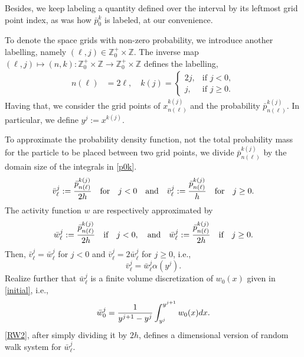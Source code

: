 \documentclass[11pt]{amsart}
\begin{document}
Besides, we keep labeling a quantity defined over the interval by its leftmost grid point index, as was how $\bar{p}^k_0$ is labeled, at our convenience.


To denote the space grids with non-zero probability, we introduce another labelling, namely $(\ell,j)\in \mathbb{Z}_0^+ \times \mathbb{Z}$. The inverse map $(\ell,j)\mapsto (n,k): \mathbb{Z}_0^+ \times \mathbb{Z} \rightarrow \mathbb{Z}_0^+ \times \mathbb{Z}$ defines the labelling,
\begin{align*}
 n(\ell) &= 2\ell, \quad 
 k(j)  =\left\{\begin{array}{lr}
        2j, & \text{if } j<0,\\
        j, & \text{if }  j\ge0.
        \end{array}\right.
\end{align*}
Having that, we consider the grid points of $x^{k(j)}_{n(\ell)}$ and the probability $\bar{p}_{n(\ell)}^{k(j)}$. In particular, we define $y^j:=x^{k(j)}$.

To approximate the probability density function, not the total probability mass for the particle to be placed between two grid points, we divide $\bar{p}_{n(\ell)}^{k(j)}$ by the domain size of the integrals in \eqref{p0k}. 
\begin{equation}\label{vj}
\bar{v}^{j}_\ell:={\bar{p}_{n(\ell)}^{k(j)} \over2h}\quad\text{for}\quad
j<0\quad\text{and}
\quad \bar{v}^{j}_\ell:={\bar{p}_{n(\ell)}^{k(j)}\over h}\quad\text{for}\quad j\ge0.
\end{equation}
The activity function $w$ are respectively approximated by
\begin{equation}\label{pandw}
\bar{w}^{j}_\ell:={\bar{p}_{n(\ell)}^{k(j)}\over2h}\quad\text{if}\quad j<0,\quad\text
{and} \quad \bar{w}^{j}_\ell:={\bar{p}_{n(\ell)}^{k(j)} \over2h}\quad\text{if}\quad j\ge0.
\end{equation}
Then, $\bar{v}^{j}_\ell=\bar{w}^{j}_\ell$ for $j<0$ and $\bar{v}^{j}_\ell=2\bar{w}^{j}_\ell$ for
$j\ge0$, i.e.,
$$
\bar{v}^j_\ell=\bar{w}_\ell^j\alpha(y^j).
$$
Realize further that $\bar{w}^{j}_\ell$ is a finite volume discretization of $w_0(x)$ given in \eqref{initial}, i.e.,
\begin{equation} \label{vol_aver+pmf}
\bar{w}_{0}^{j} ={1\over y^{j+1}-y^{j}}\int_{y^j}^{y^{j+1}} w_0(x)dx.
\end{equation}
\eqref{RW2}, after simply dividing it by $2h$, defines a dimensional version of random walk system for $\bar{w}^{j}_\ell$. 
\end{document}
